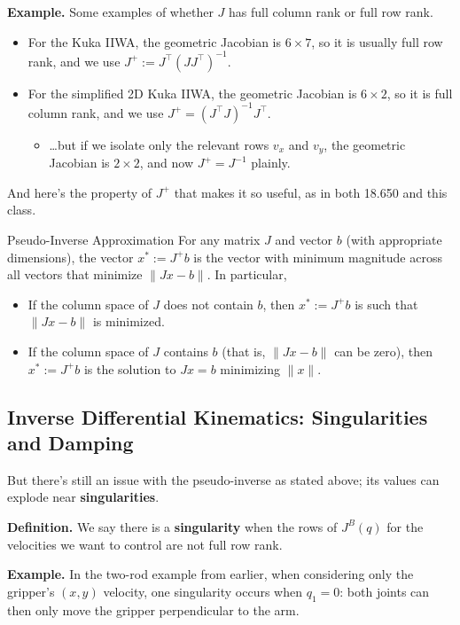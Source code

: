 \textbf{Example.}
Some examples of whether $J$ has full column rank
or full row rank.
\begin{itemize}
    \item For the Kuka IIWA, the geometric Jacobian is $6 \times 7$,
    so it is usually full row rank, and we use $J^+ := J^{\top}(JJ^{\top})^{-1}$.
    \item For the simplified 2D Kuka IIWA,
    the geometric Jacobian is $6 \times 2$,
    so it is full column rank, and we use $J^+ = (J^{\top}J)^{-1}J^{\top}$.
    \begin{itemize}
        \item \dots but if we isolate only the relevant rows
        $v_x$ and $v_y$, the geometric Jacobian is $2 \times 2$,
        and now $J^+ = J^{-1}$ plainly.
    \end{itemize}
\end{itemize}

And here's the property of $J^+$ that makes it so useful,
as in both 18.650 and this class.

\begin{theorem}{Pseudo-Inverse Approximation}
    For any matrix $J$ and vector $b$ (with appropriate dimensions),
    the vector $x^* := J^+b$ is the vector with minimum magnitude
    across all vectors that minimize $\|Jx - b\|$.  In particular,
    \begin{itemize}
        \item If the column space of $J$ does not contain $b$,
        then $x^* := J^+b$ is such that $\|Jx - b\|$ is minimized.
        \item If the column space of $J$ contains $b$
        (that is, $\|Jx - b\|$ can be zero),
        then $x^* := J^+b$ is the solution to $Jx = b$ minimizing $\|x\|$.
    \end{itemize}
\end{theorem}

\subsection{Inverse Differential Kinematics: Singularities and Damping}

But there's still an issue with the pseudo-inverse
as stated above; its values can explode near \textbf{singularities}.

\textbf{Definition.}
We say there is a \textbf{singularity} when
the rows of $J^B(q)$ for the velocities we want to control
are not full row rank.

\textbf{Example.}
In the two-rod example from earlier,
when considering only the gripper's $(x, y)$ velocity,
one singularity occurs when $q_1 = 0$:
both joints can then only move the gripper perpendicular to the arm.

